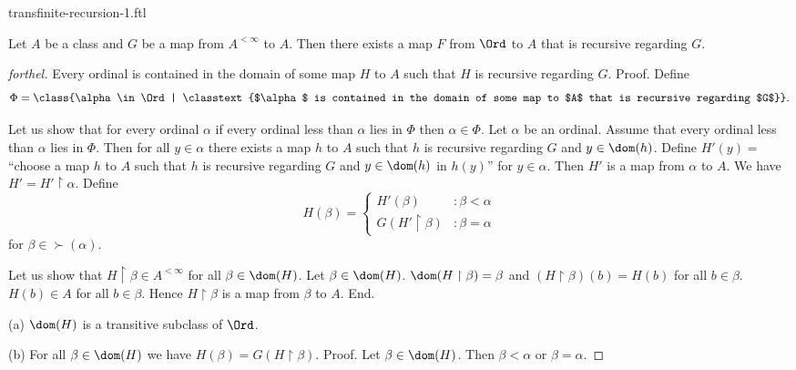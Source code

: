 \documentclass{naproche-library}
\begin{document}
\begin{smodule}[title=Transfinite Recursion I]{transfinite-recursion-1.ftl}
  
\begin{theorem*}[forthel,title=Transfinite Recursion Theorem: Existence,id=transfinite-recursion_existence]
  Let $A$ be a class and $G$ be a map from $A^{< \infty}$ to $A$.
  Then there exists a map $F$ from $\Ord$ to $A$ that is recursive regarding $G$.
\end{theorem*}
\begin{proof}[forthel]
  Every ordinal is contained in the domain of some map $H$ to $A$ such that $H$ is recursive regarding $G$. \newline
  Proof.
    Define \[ \Phi = \class{\alpha \in \Ord | \classtext{$\alpha$ is contained in the domain of some map to $A$ that is recursive regarding $G$}}. \]

    Let us show that for every ordinal $\alpha$ if every ordinal less than $\alpha$ lies in $\Phi$ then $\alpha \in \Phi$.
      Let $\alpha$ be an ordinal.
      Assume that every ordinal less than $\alpha$ lies in $\Phi$.
      Then for all $y \in \alpha$ there exists a map $h$ to $A$ such that $h$ is recursive regarding $G$ and $y \in \dom(h)$.
      Define $H'(y) =$ ``choose a map $h$ to $A$ such that $h$ is recursive regarding $G$ and $y \in \dom(h)$ in $h(y)$'' for $y \in \alpha$.
      Then $H'$ is a map from $\alpha$ to $A$.
      We have $H' = H' \restriction \alpha$.
      Define \[ H(\beta) =
        \begin{cases}
          H'(\beta)                 & : \beta < \alpha \\
          G(H' \restriction \beta)  & : \beta = \alpha
        \end{cases} \]
      for $\beta \in \succ(\alpha)$.
      
      Let us show that $H \restriction \beta \in A^{< \infty}$ for all $\beta \in \dom(H)$.
        Let $\beta \in \dom(H)$.
        $\dom(H \restriction \beta) = \beta$ and $(H \restriction \beta)(b) = H(b)$ for all $b \in \beta$.
        $H(b) \in A$ for all $b \in \beta$.
        Hence $H \restriction \beta$ is a map from $\beta$ to $A$.
      End.

      (a) $\dom(H)$ is a transitive subclass of $\Ord$.

      (b) For all $\beta \in \dom(H)$ we have $H(\beta) = G(H \restriction \beta)$. \newline
      Proof.
        Let $\beta \in \dom(H)$.
        Then $\beta < \alpha$ or $\beta = \alpha$.


\end{proof}
\end{smodule}
\end{document}
